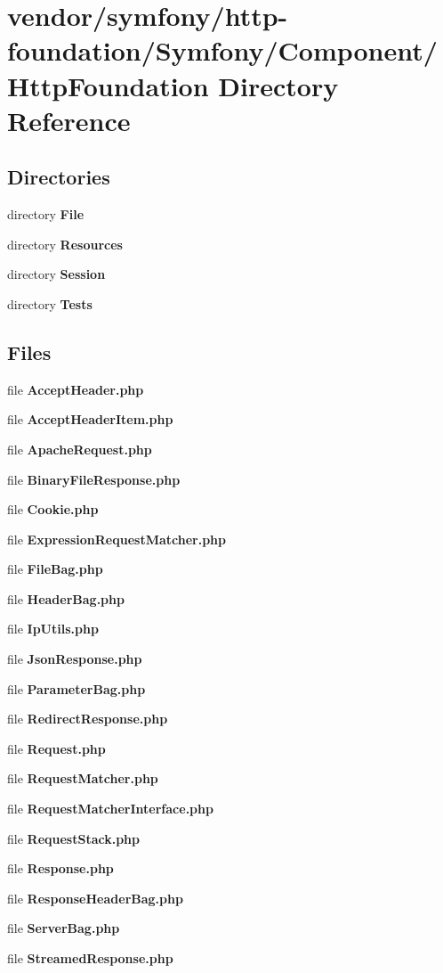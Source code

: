 \section{vendor/symfony/http-\/foundation/\+Symfony/\+Component/\+Http\+Foundation Directory Reference}
\label{dir_5aaf4274d59beb7c69267e033f72dff4}
\subsection*{Directories}
\begin{DoxyCompactItemize}
\item 
directory {\bf File}
\item 
directory {\bf Resources}
\item 
directory {\bf Session}
\item 
directory {\bf Tests}
\end{DoxyCompactItemize}
\subsection*{Files}
\begin{DoxyCompactItemize}
\item 
file {\bf Accept\+Header.\+php}
\item 
file {\bf Accept\+Header\+Item.\+php}
\item 
file {\bf Apache\+Request.\+php}
\item 
file {\bf Binary\+File\+Response.\+php}
\item 
file {\bf Cookie.\+php}
\item 
file {\bf Expression\+Request\+Matcher.\+php}
\item 
file {\bf File\+Bag.\+php}
\item 
file {\bf Header\+Bag.\+php}
\item 
file {\bf Ip\+Utils.\+php}
\item 
file {\bf Json\+Response.\+php}
\item 
file {\bf Parameter\+Bag.\+php}
\item 
file {\bf Redirect\+Response.\+php}
\item 
file {\bf Request.\+php}
\item 
file {\bf Request\+Matcher.\+php}
\item 
file {\bf Request\+Matcher\+Interface.\+php}
\item 
file {\bf Request\+Stack.\+php}
\item 
file {\bf Response.\+php}
\item 
file {\bf Response\+Header\+Bag.\+php}
\item 
file {\bf Server\+Bag.\+php}
\item 
file {\bf Streamed\+Response.\+php}
\end{DoxyCompactItemize}

